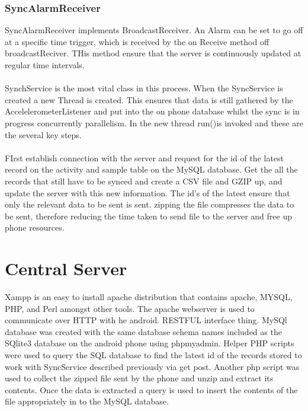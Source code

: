 \subsubsection{SyncAlarmReceiver} %
\label{ssub:alarm}
SyncAlarmReceiver implements BroadcastReceiver. An Alarm can be set to go off at a specific time trigger, which is received by the on Receive method off broadcastReciver. THis method ensure that the server is continuously updated at regular time intervals.
\paragraph{}
SynchService is the most vital class in this process. When the SyncService is created a new Thread is created. This ensures that data is still gathered by the AccelelerometerListener and put into the on phone database whilst the sync is in progress concurrently parallelism. In the new thread run()is invoked and these are the several key steps. 
\paragraph{}
FIrst establish connection with the server and request for the id of the latest record on the activity and sample table on the MySQL database. Get the all the records that still have to be synced and create a CSV file and GZIP up, and update the server with this new information. The id's of the latest ensure that only the relevant data to be sent is sent. zipping the file compresses the data to be sent, therefore reducing the time taken to send file to the server and free up phone resources. 

\section{Central Server} %
\label{sec:section_server}
Xampp is an easy to install apache distribution that contains apache, MYSQL, PHP, and Perl amongst other tools. The apache webserver is used to communicate over HTTP with he android. RESTFUL interface thing.
MySQl database was created with the same database schema names included as the SQlite3 database on the android phone using phpmyadmin. Helper PHP scripts were used to query the SQL database to find the latest id of the records stored to work with SyncService described previously via get post. Another php script was used to collect the zipped file sent by the phone and unzip and extract its contents. Once the data is extracted a query is used to insert the contents of the file appropriately in to the MySQL database.

